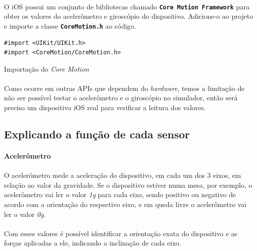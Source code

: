 \documentclass[a4paper,12pt,brazil,doubleside]{book}
\begin{document}
\begin{singlespace}
\paragraph{}O iOS possui um conjunto de bibliotecas chamado \texttt{\textbf{Core Motion Framework}} para obter os valores do acelerômetro e giroscópio do dispositivo. Adicione-o ao projeto e importe a classe \texttt{\textbf{CoreMotion.h}} ao código.

\begin{listing}[H]
\begin{verbatim}
#import <UIKit/UIKit.h>
#import <CoreMotion/CoreMotion.h>
\end{verbatim}
\caption{Importação do \emph{Core Motion}}
\end{listing}

\paragraph{}Como ocorre em outras APIs que dependem do \emph{hardware}, temos a limitação de não ser possível testar o acelerômetro e o giroscópio no simulador, então será preciso um dispositivo iOS real para verificar a leitura dos valores.

\bigskip

\subsection{Explicando a função de cada sensor}

\paragraph{}\textbf{Acelerômetro}

\paragraph{}O acelerômetro mede a aceleração do dispositivo, em cada um dos 3 eixos, em relação ao valor da gravidade. Se o dispositivo estiver numa mesa, por exemplo, o acelerômetro vai ler o valor \emph{1g} para cada eixo, sendo positivo ou negativo de acordo com a orientação do respectivo eixo, e em queda livre o acelerômetro vai ler o valor \emph{0g}.
\paragraph{}Com esses valores é possível identificar a orientação exata do dispositivo e as forças aplicadas a ele, indicando a inclinação de cada eixo.


\end{singlespace}
\end{document}
